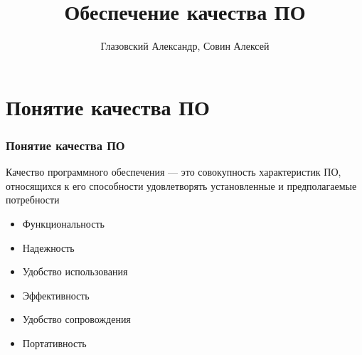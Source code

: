 \documentclass{../industrial-development}
\title{Обеспечение качества ПО}
\author{Глазовский Александр, Совин Алексей}
\date{}
\begin{document}
\begin{frame}
  \titlepage
\end{frame}



\section{Понятие качества ПО}
\begin{frame} \frametitle{Понятие качества ПО}
	\begin{block}{}
		\alert{Качество программного обеспечения} --- это совокупность характеристик ПО, относящихся к его способности удовлетворять установленные и предполагаемые потребности 
	\end{block}
\begin{itemize}
	\item Функциональность
\end{itemize}
\begin{itemize}
	\item Надежность
\end{itemize}
\begin{itemize}
	\item Удобство использования
\end{itemize}
\begin{itemize}
	\item Эффективность 
\end{itemize}
\begin{itemize}
	\item Удобство сопровождения 
\end{itemize}
\begin{itemize}
	\item Портативность  
\end{itemize}
\end{frame}
\end{document}
